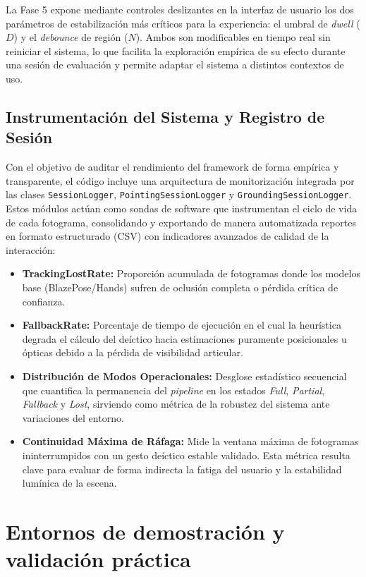 \documentclass[12pt]{report} %
\begin{document}
La Fase 5 expone mediante controles deslizantes en la interfaz de usuario los dos parámetros de estabilización más críticos para la experiencia: el umbral de \textit{dwell} ($D$) y el \textit{debounce} de región ($N$). Ambos son modificables en tiempo real sin reiniciar el sistema, lo que facilita la exploración empírica de su efecto durante una sesión de evaluación y permite adaptar el sistema a distintos contextos de uso.

\subsection{Instrumentación del Sistema y Registro de Sesión}
Con el objetivo de auditar el rendimiento del framework de forma empírica y transparente, el código incluye una arquitectura de monitorización integrada por las clases \texttt{SessionLogger}, \texttt{PointingSessionLogger} y \texttt{GroundingSessionLogger}. Estos módulos actúan como sondas de software que instrumentan el ciclo de vida de cada fotograma, consolidando y exportando de manera automatizada reportes en formato estructurado (CSV) con indicadores avanzados de calidad de la interacción:

\begin{itemize}
    \item \textbf{TrackingLostRate:} Proporción acumulada de fotogramas donde los modelos base (BlazePose/Hands) sufren de oclusión completa o pérdida crítica de confianza.
    \item \textbf{FallbackRate:} Porcentaje de tiempo de ejecución en el cual la heurística degrada el cálculo del deíctico hacia estimaciones puramente posicionales u ópticas debido a la pérdida de visibilidad articular.
    \item \textbf{Distribución de Modos Operacionales:} Desglose estadístico secuencial que cuantifica la permanencia del \textit{pipeline} en los estados \textit{Full}, \textit{Partial}, \textit{Fallback} y \textit{Lost}, sirviendo como métrica de la robustez del sistema ante variaciones del entorno.
    \item \textbf{Continuidad Máxima de Ráfaga:} Mide la ventana máxima de fotogramas ininterrumpidos con un gesto deíctico estable validado. Esta métrica resulta clave para evaluar de forma indirecta la fatiga del usuario y la estabilidad lumínica de la escena.
\end{itemize}

\section{Entornos de demostración y validación práctica}
\end{document}
